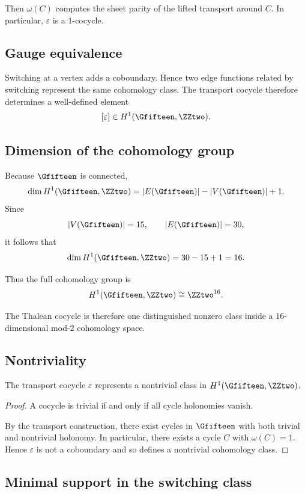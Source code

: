 Then $\omega(C)$ computes the sheet parity of the lifted transport around
$C$. In particular, $\varepsilon$ is a $1$-cocycle.

\subsection{Gauge equivalence}

Switching at a vertex adds a coboundary. Hence two edge functions related
by switching represent the same cohomology class. The transport cocycle
therefore determines a well-defined element
\[
[\varepsilon]\in H^1(\Gfifteen,\ZZtwo).
\]

\subsection{Dimension of the cohomology group}

Because $\Gfifteen$ is connected,
\[
\dim H^1(\Gfifteen,\ZZtwo)=|E(\Gfifteen)|-|V(\Gfifteen)|+1.
\]
Since
\[
|V(\Gfifteen)|=15,\qquad |E(\Gfifteen)|=30,
\]
it follows that
\[
\dim H^1(\Gfifteen,\ZZtwo)=30-15+1=16.
\]

Thus the full cohomology group is
\[
H^1(\Gfifteen,\ZZtwo)\cong \ZZtwo^{16}.
\]

The Thalean cocycle is therefore one distinguished nonzero class inside a
$16$-dimensional mod-$2$ cohomology space.

\subsection{Nontriviality}

\begin{theorem}
The transport cocycle $\varepsilon$ represents a nontrivial class in
$H^1(\Gfifteen,\ZZtwo)$.
\end{theorem}

\begin{proof}
A cocycle is trivial if and only if all cycle holonomies vanish.

By the transport construction, there exist cycles in $\Gfifteen$ with
both trivial and nontrivial holonomy. In particular, there exists a cycle
$C$ with $\omega(C)=1$. Hence $\varepsilon$ is not a coboundary and so
defines a nontrivial cohomology class.
\end{proof}

\subsection{Minimal support in the switching class}

